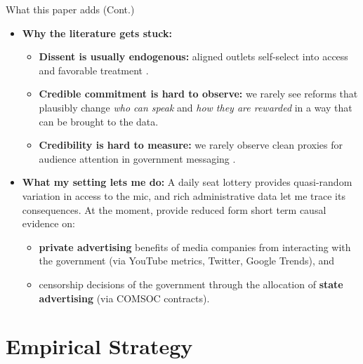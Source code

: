 \documentclass[10pt,aspectratio=169]{beamer}
\begin{document}
\begin{frame}{What this paper adds (Cont.)}
\begin{itemize}\setlength\itemsep{0.85em}

\item \textbf{Why the literature gets stuck:}
  \begin{itemize}\setlength\itemsep{0.25em}
    \item \textbf{Dissent is usually endogenous:} aligned outlets self-select into access and favorable treatment
    {\footnotesize\color{gray}\citep{ArgCorr-DiTella-AEJAE}}.
    \item \textbf{Credible commitment is hard to observe:} we rarely see reforms that plausibly change
    \textit{who can speak} and \textit{how they are rewarded} in a way that can be brought to the data.
    \item \textbf{Credibility is hard to measure:} we rarely observe clean proxies for audience attention in government messaging
    {\footnotesize\color{gray}\citep{PersuasionEmpirical-Dellavigna-AR}}.
  \end{itemize}
  
  \item \textbf{What my setting lets me do:}
  A daily seat lottery provides quasi-random variation in \alert{access to the mic},
  and rich administrative data let me trace its consequences. At the moment, provide reduced form short term causal evidence on:
  \begin{itemize}\setlength\itemsep{0.25em}
    \item \textbf{private advertising} benefits of media companies from interacting with the government (via YouTube metrics, Twitter, Google Trends), and
    \item censorship decisions of the government through the allocation of \textbf{state advertising} (via COMSOC contracts).
  \end{itemize}
\end{itemize}
\end{frame}

\section{Empirical Strategy}
\end{document}
